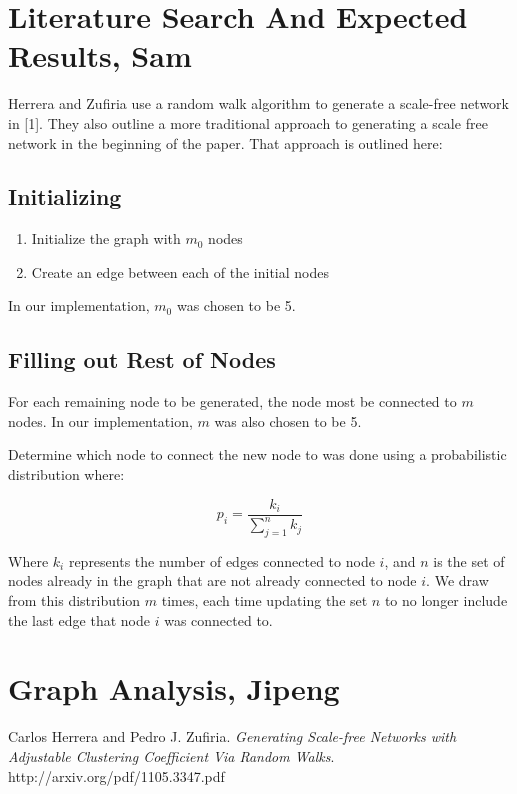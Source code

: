 \documentclass[a4paper,11pt]{article}
\begin{document}
\maketitle
\thispagestyle{empty}


\section{Literature Search And Expected Results, Sam}

Herrera and Zufiria use a random walk algorithm to generate a scale-free network in [1].  They also outline  a more traditional approach to generating a scale free network in the beginning of the paper.  That approach is outlined here:

\subsection{Initializing}
\begin{enumerate}
\item{Initialize the graph with $m_0$ nodes}
\item{Create an edge between each of the initial nodes}
\end{enumerate}

In our implementation, $m_0$ was chosen to be 5.

\subsection{Filling out Rest of Nodes}
For each remaining node to be generated, the node most be connected to $m$ nodes.  In our implementation, $m$ was also chosen to be 5.

Determine which node to connect the new node to was done using a probabilistic distribution where:

\begin{equation} \nonumber
p_{i}=\dfrac{k_{i}}{\sum_{j=1}^{n}k_{j}}
\end{equation}

Where $k_{i}$ represents the number of edges connected to node $i$, and $n$ is the set of nodes already in the graph that are not already connected to node $i$.  We draw from this distribution $m$ times, each time updating the set $n$ to no longer include the last edge that node $i$ was connected to.



 
\section{Graph Analysis, Jipeng}

\begin{thebibliography}{9}
  Carlos Herrera and Pedro J. Zufiria.
  \textit{Generating Scale-free Networks with Adjustable
Clustering Coefficient Via Random Walks}.
  http://arxiv.org/pdf/1105.3347.pdf
\end{thebibliography}  
\end{document}
